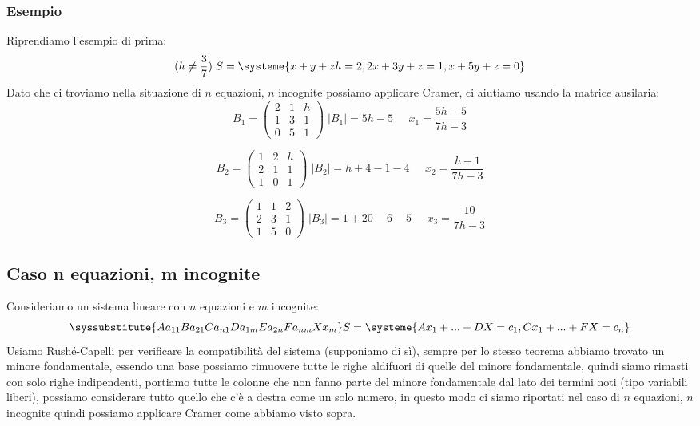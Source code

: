 \subsubsection{Esempio}
Riprendiamo l'esempio di prima:
$$
(h \neq \frac{3}{7}) \; S =  
\systeme{
x+y+zh = 2,
2x+3y+z = 1,
x+5y+z = 0
}
$$
Dato che ci troviamo nella situazione di $n$ equazioni, $n$ incognite possiamo applicare Cramer, ci aiutiamo usando la matrice ausilaria:
$$ 
B_1 = 
\begin{pmatrix}
2 & 1 & h \\
1 & 3 & 1 \\
0 & 5 & 1 
\end{pmatrix} \; |B_1| = 5h-5
\; \; \; \; \; x_1 = \frac{5h-5}{7h-3} 
$$

$$
B_2 = 
\begin{pmatrix}
1 & 2 & h \\
2 & 1 & 1 \\
1 & 0 & 1 
\end{pmatrix} \; |B_2| = h+4-1-4
\; \; \; \; \; x_2 = \frac{h-1}{7h-3} 
$$

$$
B_3 = 
\begin{pmatrix}
1 & 1 & 2 \\
2 & 3 & 1 \\
1 & 5 & 0 
\end{pmatrix} \; |B_3| = 1+20-6-5
\; \; \; \; \; x_3 = \frac{10}{7h-3} 
$$

\subsection{Caso n equazioni, m incognite}
Consideriamo un sistema lineare con $n$ equazioni e $m$ incognite:
$$
\syssubstitute{A{a_{11}}B{a_{21}}C{a_{n1}}D{a_{1m}}E{a_{2n}}F{a_{nm}}X{x_{m}}}
S=
\systeme{
  A x_1 +...+ D X  = c_1,
  C x_1 +...+ F X = c_n
}
$$
Usiamo Rushé-Capelli per verificare la compatibilità del sistema (supponiamo di sì), sempre per lo stesso teorema abbiamo trovato un minore fondamentale, essendo una base possiamo rimuovere tutte le righe aldifuori di quelle del minore fondamentale, quindi siamo rimasti con solo righe indipendenti, portiamo tutte le colonne che non fanno parte del minore fondamentale dal lato dei termini noti (tipo variabili liberi), possiamo considerare tutto quello che c'è a destra come un solo numero, in questo modo ci siamo riportati nel caso di $n$ equazioni, $n$ incognite quindi possiamo applicare Cramer come abbiamo visto sopra.

